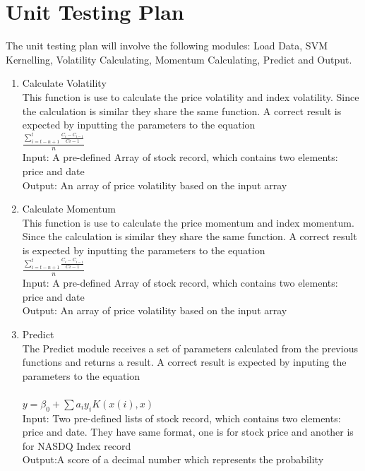 \documentclass[12pt, titlepage]{article}
\begin{document}
\section{Unit Testing Plan}
The unit testing plan will involve the following modules: Load Data, SVM Kernelling, Volatility Calculating, Momentum Calculating, Predict and Output.\\
\begin{enumerate}

\item{ Calculate Volatility\\}
This function is use to calculate the price volatility and index volatility. Since the calculation is similar they share the same function. A correct result is expected by inputting the parameters to the equation \\
$\frac{\sum_{i=t-n+1}^{t} \frac{C_i-C_{i-1}}{C{i-1}}}{n}$ \\ 

Input: A pre-defined Array of stock record, which contains two elements: price and date\\
Output: An array of price volatility based on the input array\\


\item{ Calculate Momentum\\}
This function is use to calculate the price momentum and index momentum. Since the calculation is similar they share the same function. A correct result is expected by inputting the parameters to the equation \\
$\frac{\sum_{i=t-n+1}^{t} \frac{C_i-C_{i-1}}{C{i-1}}}{n}$ \\ 

Input: A pre-defined Array of stock record, which contains two elements: price and date\\
Output: An array of price volatility based on the input array\\


\item{Predict \\}
The Predict module receives a set of parameters calculated from the previous functions and returns a result. A correct result is expected by inputing the parameters to the equation \\\\
$y=\beta _0+\sum {a_iy_iK(x(i),x)}$\\
Input: Two pre-defined lists of stock record, which contains two elements: price and date. They have same format, one is for stock price and another is for NASDQ Index record\\
Output:A score of a decimal number which represents the probability\\

\end{enumerate} 
\end{document}
